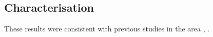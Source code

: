 \subsection{Characterisation}



These results were consistent with previous studies in the area \cite{Ranck_1963}, \cite{Logothetis_2007}.

